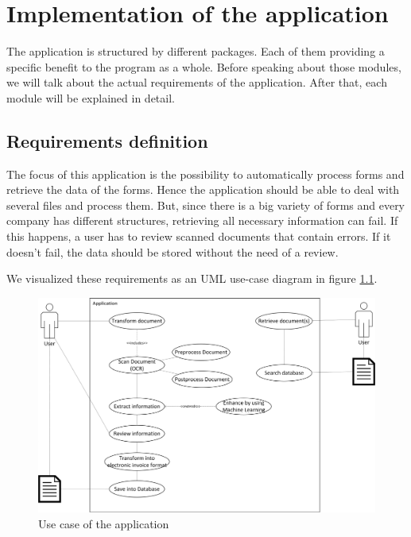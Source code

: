 %
% 
\chapter{Implementation of the application}
\label{cha5}

The application is structured by different packages. Each of them providing a specific benefit to the program as a whole. Before speaking about those modules, we will talk about the actual requirements of the application. After that, each module will be explained in detail.

\section{Requirements definition}
\label{sec5.1}

The focus of this application is the possibility to automatically process forms and retrieve the data of the forms. Hence the application should be able to deal with several files and process them. But, since there is a big variety of forms and every company has different structures, retrieving all necessary information can fail. If this happens, a user has to review scanned documents that contain errors. If it doesn't fail, the data should be stored without the need of a review.

We visualized these requirements as an UML use-case diagram in figure \ref{totalApplicationCase}.

\begin{figure}[ht!]
\centering
\includegraphics[width=\textwidth,natwidth=243,natheight=155]{Images/UseCase/TotalApplicationCase.pdf}
\caption{Use case of the application \label{totalApplicationCase}}
\end{figure}

